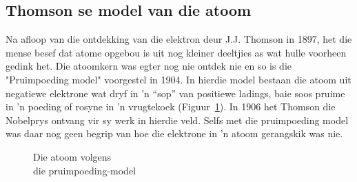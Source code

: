             \subsection*{Thomson se model van die atoom}
            \nopagebreak
\begin{minipage}{.5\textwidth}
        \label{m38756*id254616}
Na afloop van die ontdekking van die elektron deur J.J. Thomson in 1897, het die mense besef dat atome opgebou is uit nog kleiner deeltjies as wat hulle voorheen gedink het. Die atoomkern was egter nog nie ontdek nie en so is die "Pruimpoeding model" voorgestel in 1904. In hierdie model bestaan die atoom uit negatiewe elektrone wat dryf in   'n “sop” van positiewe ladings, baie soos pruime in  'n poeding of rosyne in  'n vrugtekoek (Figuur~\ref{fig:atom:plumpudding}). In 1906 het Thomson die Nobelprys ontvang vir sy werk in hierdie veld. Selfs met die pruimpoeding model was daar nog geen begrip van hoe die elektrone in   'n atoom gerangskik was nie.\\ 
\end{minipage}
\begin{minipage}{.5\textwidth}
    \setcounter{subfigure}{0}
	\begin{figure}[H] %
    \begin{center}
\begin{minipage}{.8\textwidth}
\caption{Die atoom volgens \\ die pruimpoeding-model}
\end{minipage}
\label{fig:atom:plumpudding}
\end{center}
 \end{figure}    
\end{minipage}   
      


